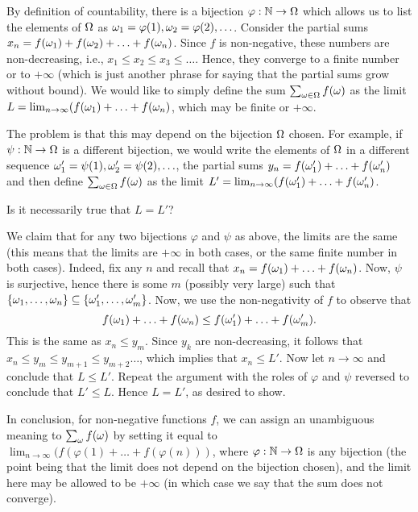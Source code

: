 \documentclass[preprint,  11pt]{amsart}
\renewcommand\phi{{\varphi}}
\begin{document}
 By definition of countability, there is a bijection $\phi:\N\to \Ome$ which allows us to list the elements of $\Omega$ as $\ome_{1}=\phi(1),\ome_{2}=\phi(2),\ldots$. Consider the partial sums $x_{n}=f(\omega_{1})+f(\omega_{2})+\ldots +f(\omega_{n})$. Since $f$ is non-negative, these numbers are non-decreasing, i.e., $x_{1}\le x_{2}\le x_{3}\le \ldots$. Hence, they converge to a finite number or to $+\infty$ (which is just another phrase for saying that the partial sums grow without bound). We would like to simply define the sum $\sum_{\omega\in \Omega}f(\omega)$ as the limit $L=\lim_{n\rightarrow \infty}(f(\omega_{1})+\ldots +f(\omega_{n})$, which may be finite or $+\infty$.

The problem is that this may depend on the bijection $\Omega$ chosen. For example, if $\psi:\mathbb{N}\rightarrow \Omega$ is a different bijection, we would write the elements of $\Omega$ in a different sequence $\omega_{1}'=\psi(1),\omega_{2}'=\psi(2),\ldots$, the partial sums $y_{n}=f(\omega_{1}')+\ldots +f(\omega_{n}')$ and then define $\sum_{\omega\in \Omega}f(\omega)$ as the limit $L'=\lim_{n\rightarrow \infty}(f(\omega_{1}')+\ldots +f(\omega_{n}')$. 

Is it necessarily true that $L=L'$? 

 We claim that for any two bijections $\phi$ and $\psi$ as above, the limits are the same (this means that the limits are $+\infty$ in both cases, or the same finite number in both cases). Indeed, fix any $n$ and recall that $x_{n}=f(\omega_{1})+\ldots +f(\omega_{n})$. Now, $\psi$ is surjective, hence there is some $m$ (possibly very large) such that $\{\omega_{1},\ldots,\omega_{n}\}\subseteq \{\omega_{1}',\ldots ,\omega_{m}'\}$. Now, we use the non-negativity of $f$ to observe that 
$$
f(\omega_{1})+\ldots +f(\omega_{n})\le f(\omega_{1}')+\ldots +f(\omega_{m}').
$$ 
This is the same as $x_{n}\le y_{m}$. Since $y_{k}$ are non-decreasing, it follows that $x_{n}\le y_{m}\le y_{m+1}\le y_{m+2}\ldots$, which implies that $x_{n}\le L'$. Now let $n\to \infty$ and conclude that $L\le L'$. Repeat the argument with the roles of $\phi$ and $\psi$ reversed to conclude that $L'\le L$. Hence $L=L'$, as desired to show. 

In conclusion, for non-negative functions $f$, we can assign an unambiguous meaning to $\sum_{\omega}f(\omega)$ by setting it equal to $\lim_{n\to \infty}(f(\phi(1)+\ldots +f(\phi(n)))$, where $\phi:\N\to \Ome$ is any bijection (the point being that the limit does not depend on the bijection chosen), and the limit here may be allowed to be $+\infty$ (in which case we say that the sum does not converge).
\end{document}
